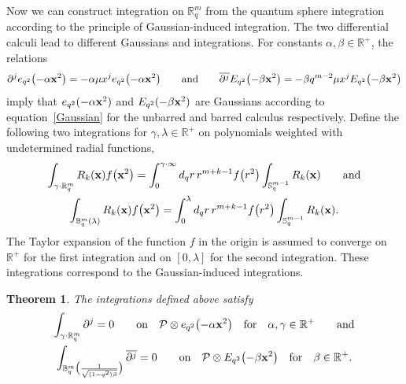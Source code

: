 \documentclass[11pt]{article}
\newtheorem{theorem}{Theorem}
\newcommand{\mR}{\mathbb{R}}
\newcommand{\mS}{\mathbb{S}}
\newcommand{\mB}{\mathbb{B}}
\newcommand{\cP}{\mathcal{P}}
\numberwithin{equation}{section}
\begin{document}
Now we can construct integration on $\mR^m_q$ from the quantum sphere integration according to the principle of Gaussian-induced integration. The two dif\/ferential calculi lead to dif\/ferent Gaussians and integrations. For constants $\alpha,\beta\in\mR^+$, the relations
\begin{gather*}
\partial^je_{q^2}\big({-}\alpha\bold{x}^2\big)=-\alpha\mu x^je_{q^2}\big({-}\alpha\bold{x}^2\big)\qquad \mbox{and}\qquad \overline{\partial^j} E_{q^2}\big({-}\beta\bold{x}^2\big)=-\beta q^{m-2}\mu x^jE_{q^2}\big({-}\beta\bold{x}^2\big)
\end{gather*}
imply that $e_{q^2}(-\alpha\bold{x}^2)$ and $E_{q^2}(-\beta\bold{x}^2)$ are Gaussians according to equation~\eqref{Gaussian} for the unbarred and barred calculus respectively. Def\/ine the following two integrations for $\gamma,\lambda\in\mR^+$ on polynomials weighted with undetermined radial functions,
\begin{gather*}
\int_{\gamma\cdot\mR^m_q}R_{k}(\bold{x})f\big(\bold{x}^2\big) = \int_0^{\gamma\cdot\infty}d_qr\,r^{m+k-1}f\big(r^2\big)\int_{\mS^{m-1}_q}R_{k}(\bold{x})\qquad \mbox{and}\\
\int_{\mB^m_q(\lambda)}R_{k}(\bold{x})f\big(\bold{x}^2\big) = \int_0^{\lambda}d_qr\,r^{m+k-1}f\big(r^2\big)\int_{\mS^{m-1}_q}R_{k}(\bold{x}).
\end{gather*}
The Taylor expansion of the function $f$ in the origin is assumed to converge on $\mR^+$ for the f\/irst integration and on $[0,\lambda]$ for the second integration. These integrations correspond to the Gaussian-induced integrations.
\begin{theorem}
\label{2indint}
The integrations defined above satisfy
\begin{gather*}
\int_{\gamma\cdot\mR^m_q}\partial^j=0 \qquad \mbox{on}\quad  \cP\otimes e_{q^2}\big({-}\alpha\bold{x}^2\big)\quad \mbox{for}\quad \alpha,\gamma\in\mR^+\qquad\mbox{and}\\
\int_{\mB^m_q\big(\frac{1}{\sqrt{(1-q^2)\beta}}\big)}\overline{\partial^j}=0\qquad \mbox{on}\quad \cP\otimes E_{q^2}\big({-}\beta\bold{x}^2\big)\quad\mbox{for}\quad\beta\in\mR^+.
\end{gather*}
\end{theorem}
\end{document}
